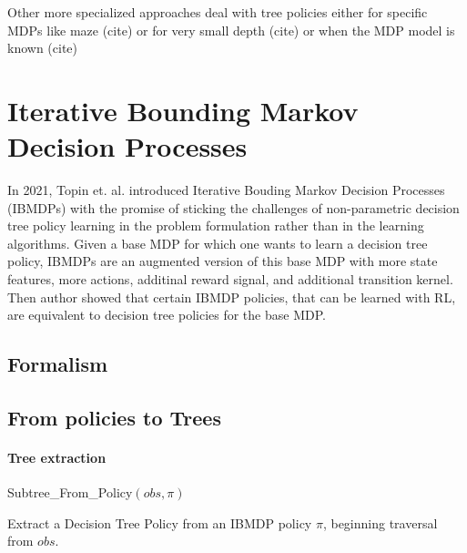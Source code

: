 Other more specialized approaches deal with tree policies either for specific MDPs like maze (cite) or for very small depth (cite) or when the MDP model is known (cite)
\section{Iterative Bounding Markov Decision Processes}
In 2021, Topin et. al. introduced Iterative Bouding Markov Decision Processes (IBMDPs) with the promise of sticking the challenges of non-parametric decision tree policy learning in the problem formulation rather than in the learning algorithms.
Given a base MDP for which one wants to learn a decision tree policy, IBMDPs are an augmented version of this base MDP with more state features, more actions, additinal reward signal, and additional transition kernel.
Then author showed that certain IBMDP policies, that can be learned with RL, are equivalent to decision tree policies for the base MDP. 
\subsection{Formalism}

\subsection{From policies to Trees}
\paragraph{Tree extraction}
\begin{algorithm}[t]
    
    
    
    \Return Subtree\_From\_Policy$(obs, \pi)$
    \caption{Extract a Decision Tree Policy from an IBMDP policy $\pi$, beginning traversal from $obs$.}\label{alg_extract_tree}
\end{algorithm}

